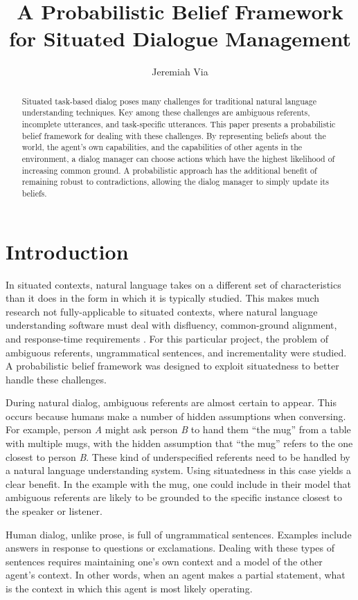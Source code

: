 \documentclass[12pt]{article}
\title{A Probabilistic Belief Framework for Situated Dialogue Management}
\author{Jeremiah Via}
\date{}
\begin{document}
\maketitle
\begin{abstract}
  Situated task-based dialog poses many challenges for traditional
  natural language understanding techniques. Key among these
  challenges are ambiguous referents, incomplete utterances, and
  task-specific utterances. This paper presents a probabilistic belief
  framework for dealing with these challenges. By representing beliefs
  about the world, the agent's own capabilities, and the capabilities
  of other agents in the environment, a dialog manager can choose
  actions which have the highest likelihood of increasing common
  ground. A probabilistic approach has the additional benefit of
  remaining robust to contradictions, allowing the dialog manager to
  simply update its beliefs.
\end{abstract}

\section{Introduction}
\label{sec:intro}
In situated contexts, natural language takes on a different set of
characteristics than it does in the form in which it is typically
studied. This makes much research not fully-applicable to situated
contexts, where natural language understanding software must deal with
disfluency, common-ground alignment, and response-time requirements
\cite{Scheutz2011:dialogue}. For this particular project, the problem
of ambiguous referents, ungrammatical sentences, and incrementality
were studied. A probabilistic belief framework was designed to exploit
situatedness to better handle these challenges.

During natural dialog, ambiguous referents are almost certain to
appear. This occurs because humans make a number of hidden assumptions
when conversing. For example, person \textit{A} might ask person
\textit{B} to hand them ``the mug'' from a table with multiple mugs,
with the hidden assumption that ``the mug'' refers to the one closest
to person \textit{B}. These kind of underspecified referents need to
be handled by a natural language understanding system. Using
situatedness in this case yields a clear benefit. In the example with
the mug, one could include in their model that ambiguous referents are
likely to be grounded to the specific instance closest to the speaker
or listener.

Human dialog, unlike prose, is full of ungrammatical
sentences. Examples include answers in response to questions or
exclamations. Dealing with these types of sentences requires
maintaining one's own context and a model of the other agent's
context. In other words, when an agent makes a partial statement, what
is the context in which this agent is most likely operating.
\end{document}

